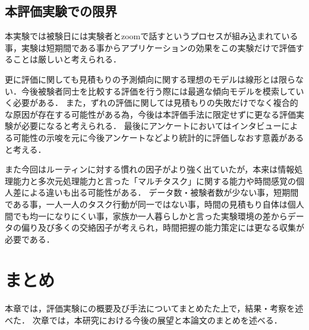 \subsection{本評価実験での限界}
本実験では被験日には実験者とzoomで話すというプロセスが組み込まれている事，実験は短期間である事からアプリケーションの効果をこの実験だけで評価することは厳しいと考えられる．

更に評価に関しても見積もりの予測傾向に関する理想のモデルは線形とは限らない．今後被験者同士を比較する評価を行う際には最適な傾向モデルを模索していく必要がある．
また，ずれの評価に関しては見積もりの失敗だけでなく複合的な原因が存在する可能性がある為，今後は本評価手法に限定せずに更なる評価実験が必要になると考えられる．
最後にアンケートにおいてはインタビューによる可能性の示唆を元に今後アンケートなどより統計的に評価しなおす意義があると考える．

また今回はルーティンに対する慣れの因子がより強く出ていたが，本来は情報処理能力と多次元処理能力と言った「マルチタスク」に関する能力\cite{multitask}や時間感覚\cite{Tayama2018}の個人差による違いも出る可能性がある．
データ数・被験者数が少ない事，短期間である事，一人一人のタスク行動が同一ではない事，時間の見積もり自体は個人間でも均一になりにくい事，家族か一人暮らしかと言った実験環境の差からデータの偏り及び多くの交絡因子が考えられ，時間把握の能力策定には更なる収集が必要である．
\section{まとめ}
本章では，評価実験にの概要及び手法についてまとめたた上で，結果・考察を述べた．
次章では，本研究における今後の展望と本論文のまとめを述べる．
